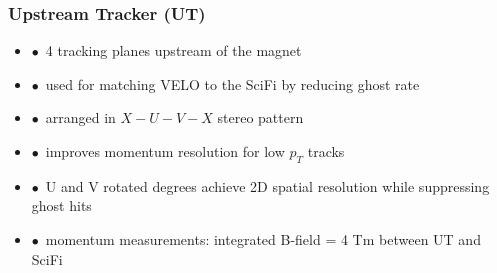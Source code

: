 \documentclass[aspectratio=1610, 12pt, xcolor=dvipsnames]{beamer}
\begin{document}
\begin{frame}\frametitle{Upstream Tracker (UT)}
  \begin{itemize}
    \item $\bullet$\, 4 tracking planes upstream of the magnet
    \item $\bullet$\, used for matching VELO to the SciFi by reducing ghost rate
    \item $\bullet$\, arranged in $X-U-V-X$ stereo pattern
    \item $\bullet$\, improves momentum resolution for low $p_T$ tracks
    \item $\bullet$\, U and V rotated  degrees \to achieve 2D spatial resolution while suppressing ghost hits
    \item $\bullet$\, momentum measurements: integrated B-field = 4 Tm between UT and SciFi
  \end{itemize}
\end{frame}
\end{document}
